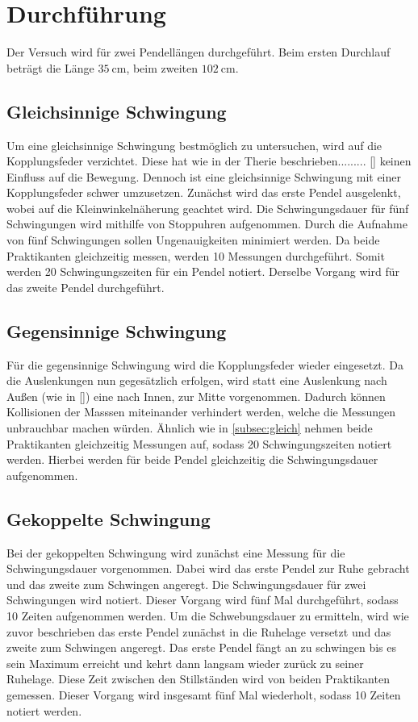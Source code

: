 \section{Durchführung}
\label{sec:Durchführung}
Der Versuch wird für zwei Pendellängen durchgeführt.
Beim ersten Durchlauf beträgt die Länge $\SI{35}{\centi\metre}$, beim zweiten $\SI{102}{\centi\metre}$.

\subsection{Gleichsinnige Schwingung}
\label{subsec:gleich}
Um eine gleichsinnige Schwingung bestmöglich zu untersuchen, wird auf die Kopplungsfeder verzichtet.
Diese hat wie in der Therie beschrieben......... \autoref{} keinen Einfluss auf die Bewegung.
Dennoch ist eine gleichsinnige Schwingung mit einer Kopplungsfeder schwer umzusetzen.
\noindent
Zunächst wird das erste Pendel ausgelenkt, wobei auf die Kleinwinkelnäherung geachtet wird.
Die Schwingungsdauer für fünf Schwingungen wird mithilfe von Stoppuhren aufgenommen.
Durch die Aufnahme von fünf Schwingungen sollen Ungenauigkeiten minimiert werden.
Da beide Praktikanten gleichzeitig messen, werden 10 Messungen durchgeführt.
Somit werden 20 Schwingungszeiten für ein Pendel notiert.
Derselbe Vorgang wird für das zweite Pendel durchgeführt.

\subsection{Gegensinnige Schwingung}
Für die gegensinnige Schwingung wird die Kopplungsfeder wieder eingesetzt.
Da die Auslenkungen nun gegesätzlich erfolgen, wird statt eine Auslenkung nach Außen (wie in \autoref{})
eine nach Innen, zur Mitte vorgenommen. Dadurch können Kollisionen der Masssen miteinander verhindert werden,
welche die Messungen unbrauchbar machen würden.
Ähnlich wie in \autoref{subsec:gleich} nehmen beide Praktikanten gleichzeitig Messungen auf, sodass 20 Schwingungszeiten notiert werden.
Hierbei werden für beide Pendel gleichzeitig die Schwingungsdauer aufgenommen.

\subsection{Gekoppelte Schwingung}
Bei der gekoppelten Schwingung wird zunächst eine Messung für die Schwingungsdauer vorgenommen.
Dabei wird das erste Pendel zur Ruhe gebracht und das zweite zum Schwingen angeregt.
Die Schwingungsdauer für zwei Schwingungen wird notiert.
Dieser Vorgang wird fünf Mal durchgeführt, sodass 10 Zeiten aufgenommen werden.
\noindent
Um die Schwebungsdauer zu ermitteln, wird wie zuvor beschrieben das erste Pendel zunächst in die Ruhelage versetzt und das zweite zum Schwingen
angeregt.
Das erste Pendel fängt an zu schwingen bis es sein Maximum erreicht und kehrt dann langsam wieder zurück zu seiner Ruhelage.
Diese Zeit zwischen den Stillständen wird von beiden Praktikanten gemessen.
Dieser Vorgang wird insgesamt fünf Mal wiederholt, sodass 10 Zeiten notiert werden.